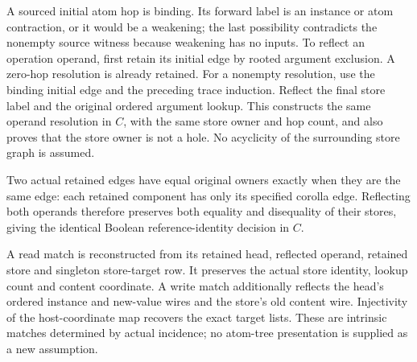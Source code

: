 A sourced initial atom hop is binding. Its forward label is an instance or
atom contraction, or it would be a weakening; the last possibility contradicts
the nonempty source witness because weakening has no inputs. To reflect an
operation operand, first retain its initial edge by rooted argument exclusion.
A zero-hop resolution is already retained. For a nonempty resolution, use the
binding initial edge and the preceding trace induction. Reflect the final
store label and the original ordered argument lookup. This constructs the
same operand resolution in $C$, with the same store owner and hop count, and
also proves that the store owner is not a hole. No acyclicity of the surrounding
store graph is assumed.

Two actual retained edges have equal original owners exactly when they are
the same edge: each retained component has only its specified corolla edge.
Reflecting both operands therefore preserves both equality and disequality
of their stores, giving the identical Boolean reference-identity decision in
$C$.

A read match is reconstructed from its retained head, reflected operand,
retained store and singleton store-target row. It preserves the actual store
identity, lookup count and content coordinate. A write match additionally
reflects the head's ordered instance and new-value wires and the store's old
content wire. Injectivity of the host-coordinate map recovers the exact target
lists. These are intrinsic matches determined by actual incidence; no atom-tree
presentation is supplied as a new assumption.

